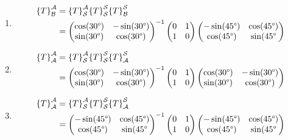 \documentclass[12pt]{article}
\newcommand{\based}[3]{{\{#1\}}_{#2}^{#3}}
\begin{document}
\begin{enumerate}[label=(\alph*)]
	\item
	\begin{align*}
		\based{T}{\mathcal{B}}{\mathcal{A}}
		&=
		\based{T}{\mathcal{S}}{\mathcal{A}}
		\based{T}{\mathcal{S}}{\mathcal{S}}
		\based{T}{\mathcal{B}}{\mathcal{S}}
		\\ &=
		\begin{pmatrix}
			\cos(30 \degree) & -\sin(30 \degree) \\
			\sin(30 \degree) & \cos(30 \degree)
		\end{pmatrix}^{-1}
		\begin{pmatrix} 0 & 1 \\ 1 & 0 \end{pmatrix}
		\begin{pmatrix}
			-\sin(45 \degree) & \cos(45 \degree) \\
			\cos(45 \degree) & \sin(45 \degree
		\end{pmatrix}
	\end{align*}
	
	\item
	\begin{align*}
		\based{T}{\mathcal{A}}{\mathcal{A}}
		&=
		\based{T}{\mathcal{S}}{\mathcal{A}}
		\based{T}{\mathcal{S}}{\mathcal{S}}
		\based{T}{\mathcal{A}}{\mathcal{S}}
		\\ &=
		\begin{pmatrix}
			\cos(30 \degree) & -\sin(30 \degree) \\
			\sin(30 \degree) & \cos(30 \degree)
		\end{pmatrix}^{-1}
		\begin{pmatrix} 0 & 1 \\ 1 & 0 \end{pmatrix}
		\begin{pmatrix}
			\cos(30 \degree) & -\sin(30 \degree) \\
			\sin(30 \degree) & \cos(30 \degree)
		\end{pmatrix}
	\end{align*}
	
	\item
	\begin{align*}
		\based{T}{\mathcal{A}}{\mathcal{A}}
		&=
		\based{T}{\mathcal{S}}{\mathcal{A}}
		\based{T}{\mathcal{S}}{\mathcal{S}}
		\based{T}{\mathcal{A}}{\mathcal{S}}
		\\ &=
		\begin{pmatrix}
			-\sin(45 \degree) & \cos(45 \degree) \\
			\cos(45 \degree) & \sin(45 \degree
		\end{pmatrix}^{-1}
		\begin{pmatrix} 0 & 1 \\ 1 & 0 \end{pmatrix}
		\begin{pmatrix}
			-\sin(45 \degree) & \cos(45 \degree) \\
			\cos(45 \degree) & \sin(45 \degree
		\end{pmatrix}
	\end{align*}
\end{enumerate}
\newpage
\end{document}
